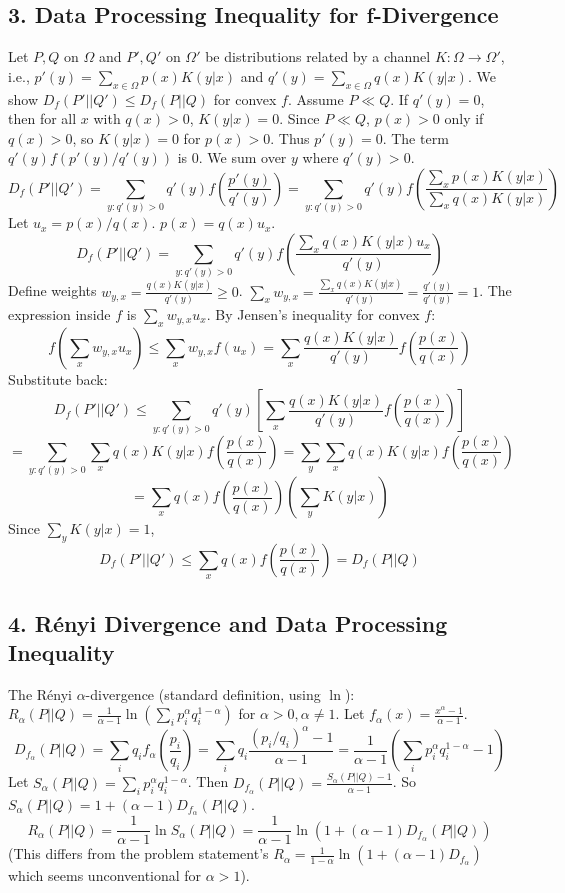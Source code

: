 \documentclass{article}
\begin{document}
\subsection*{3. Data Processing Inequality for f-Divergence}

Let $P, Q$ on $\Omega$ and $P', Q'$ on $\Omega'$ be distributions related by a channel $K: \Omega \to \Omega'$, i.e., $p'(y) = \sum_{x \in \Omega} p(x) K(y|x)$ and $q'(y) = \sum_{x \in \Omega} q(x) K(y|x)$. We show $D_f(P'||Q') \le D_f(P||Q)$ for convex $f$. Assume $P \ll Q$.
If $q'(y) = 0$, then for all $x$ with $q(x) > 0$, $K(y|x) = 0$. Since $P \ll Q$, $p(x)>0$ only if $q(x)>0$, so $K(y|x)=0$ for $p(x)>0$. Thus $p'(y)=0$. The term $q'(y) f(p'(y)/q'(y))$ is 0. We sum over $y$ where $q'(y) > 0$.
\[ D_f(P'||Q') = \sum_{y: q'(y) > 0} q'(y) f\left(\frac{p'(y)}{q'(y)}\right) = \sum_{y: q'(y) > 0} q'(y) f\left(\frac{\sum_x p(x) K(y|x)}{\sum_x q(x) K(y|x)}\right) \]
Let $u_x = p(x)/q(x)$. $p(x) = q(x) u_x$.
\[ D_f(P'||Q') = \sum_{y: q'(y) > 0} q'(y) f\left(\frac{\sum_x q(x) K(y|x) u_x}{q'(y)}\right) \]
Define weights $w_{y,x} = \frac{q(x) K(y|x)}{q'(y)} \ge 0$. $\sum_x w_{y,x} = \frac{\sum_x q(x) K(y|x)}{q'(y)} = \frac{q'(y)}{q'(y)} = 1$.
The expression inside $f$ is $\sum_x w_{y,x} u_x$. By Jensen's inequality for convex $f$:
\[ f\left(\sum_x w_{y,x} u_x\right) \le \sum_x w_{y,x} f(u_x) = \sum_x \frac{q(x) K(y|x)}{q'(y)} f\left(\frac{p(x)}{q(x)}\right) \]
Substitute back:
\[ D_f(P'||Q') \le \sum_{y: q'(y) > 0} q'(y) \left[ \sum_x \frac{q(x) K(y|x)}{q'(y)} f\left(\frac{p(x)}{q(x)}\right) \right] \]
\[ = \sum_{y: q'(y) > 0} \sum_x q(x) K(y|x) f\left(\frac{p(x)}{q(x)}\right) = \sum_y \sum_x q(x) K(y|x) f\left(\frac{p(x)}{q(x)}\right) \]
\[ = \sum_x q(x) f\left(\frac{p(x)}{q(x)}\right) \left( \sum_y K(y|x) \right) \]
Since $\sum_y K(y|x) = 1$,
\[ D_f(P'||Q') \le \sum_x q(x) f\left(\frac{p(x)}{q(x)}\right) = D_f(P||Q) \]

\subsection*{4. Rényi Divergence and Data Processing Inequality}

The Rényi $\alpha$-divergence (standard definition, using $\ln$): $R_\alpha(P||Q) = \frac{1}{\alpha-1} \ln \left( \sum_i p_i^\alpha q_i^{1-\alpha} \right)$ for $\alpha > 0, \alpha \neq 1$.
Let $f_\alpha(x) = \frac{x^\alpha - 1}{\alpha - 1}$.
\[ D_{f_\alpha}(P||Q) = \sum_i q_i f_\alpha\left(\frac{p_i}{q_i}\right) = \sum_i q_i \frac{(p_i/q_i)^\alpha - 1}{\alpha - 1} = \frac{1}{\alpha - 1} \left( \sum_i p_i^\alpha q_i^{1-\alpha} - 1 \right) \]
Let $S_\alpha(P||Q) = \sum_i p_i^\alpha q_i^{1-\alpha}$. Then $D_{f_\alpha}(P||Q) = \frac{S_\alpha(P||Q) - 1}{\alpha - 1}$.
So $S_\alpha(P||Q) = 1 + (\alpha - 1) D_{f_\alpha}(P||Q)$.
\[ R_\alpha(P||Q) = \frac{1}{\alpha-1} \ln S_\alpha(P||Q) = \frac{1}{\alpha-1} \ln(1+(\alpha-1)D_{f_\alpha}(P||Q)) \]
(This differs from the problem statement's $R_\alpha = \frac{1}{1-\alpha} \ln(1+(\alpha-1)D_{f_\alpha})$ which seems unconventional for $\alpha>1$).
\end{document}
